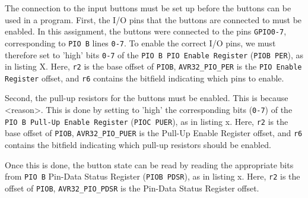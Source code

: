 The connection to the input buttons must be set up before the buttons can be used in a program.
First, the I/O pins that the buttons are connected to must be enabled.
In this assignment, the buttons were connected to the pins \texttt{GPIO0-7}, corresponding to \texttt{PIO B} lines \texttt{0-7}.
To enable the correct I/O pins, we must therefore set to 'high' bits \texttt{0-7} of the \texttt{PIO B PIO Enable Register} (\texttt{PIOB PER}), as in listing X.
Here, \texttt{r2} is the base offset of \texttt{PIOB}, \texttt{AVR32\_PIO\_PER} is the \texttt{PIO Enable Register} offset, and \texttt{r6} contains the bitfield indicating which pins to enable.


Second, the pull-up resistors for the buttons must be enabled. This is because <reason>.
This is done by setting to 'high' the corresponding bits (\texttt{0-7}) of the \texttt{PIO B Pull-Up Enable Register} (\texttt{PIOC PUER}), as in listing x.
Here, \texttt{r2} is the base offset of \texttt{PIOB}, \texttt{AVR32\_PIO\_PUER} is the Pull-Up Enable Register offset, and \texttt{r6} contains the bitfield indicating which pull-up resistors should be enabled.


Once this is done, the button state can be read by reading the appropriate bits from \texttt{PIO B} Pin-Data Status Register (\texttt{PIOB PDSR}), as in listing x.
Here, \texttt{r2} is the offset of \texttt{PIOB}, \texttt{AVR32\_PIO\_PDSR} is the Pin-Data Status Register offset.

